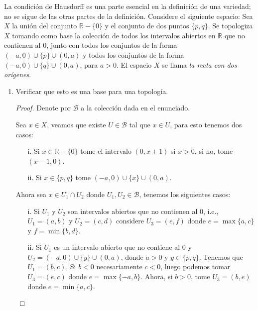 
\item La condición de Hausdorff es una parte esencial en la definición de una variedad; no se sigue de las otras partes de la definición. Considere el siguiente espacio:  
    Sea \( X \) la unión del conjunto \( \mathbb{R} - \{ 0 \} \) y el conjunto de dos puntos \( \{ p, q \} \). Se topologiza \( X \) tomando como base la colección de todos los intervalos abiertos en \( \mathbb{R} \) que no contienen al \( 0 \), junto con todos los conjuntos de la forma \( (-a,0) \cup \{ p \} \cup (0,a) \) y todos los conjuntos de la forma \( (-a,0) \cup \{ q \} \cup (0,a) \), para \( a > 0 \). El espacio \( X \) se llama \textit{la recta con dos orígenes}.
    
    \begin{enumerate}
        \item Verificar que esto es una base para una topología.

        \begin{proof}
            Denote por $\mathcal{B}$ a la colección dada en el enunciado.

            Sea $x \in X$, veamos que existe $U \in \mathcal{B}$ tal que $x \in U$, para esto tenemos dos casos:

            \begin{itemize}
                \item[i.]
                Si $x \in \mathbb{R}-\{0\}$ tome el intervalo $(0,x+1)$ si $x>0$, si no, tome $(x-1,0)$.
                \item[ii.]
                Si $x \in \{p,q\}$ tome $(-a,0) \cup \{x\} \cup (0,a)$. 
            \end{itemize}

            Ahora sea $x \in U_1 \cap U_2$ donde $U_1,U_2 \in \mathcal{B}$, tenemos los siguientes casos:

            \begin{itemize}
                \item[i.]
                 Si $U_1$ y $U_2$ son intervalos abiertos que no contienen al 0, i.e., $U_1 = (a,b)$ y $U_2 = (c,d)$  considere $U_3=(e,f)$ donde $e=\max\{a,c\}$ y $f=\min\{b,d\}$.

                \item[ii.]
                  Si $U_1$ es un intervalo abierto que no contiene al 0 y $U_2= (-a,0) \cup \{y\} \cup (0,a)$, donde $a>0$ y $y \in \{p,q\}$. Tenemos que $U_1 = (b,c)$, Si $b<0$ necesariamente $c<0$, luego podemos tomar $U_3 = (e,c)$ donde $e=\max\{-a,b\}$. Ahora, si $b>0$, tome $U_3 = (b,e)$ donde $e=\min\{a,c\}$.


\end{itemize}
\end{proof}
\end{enumerate}

